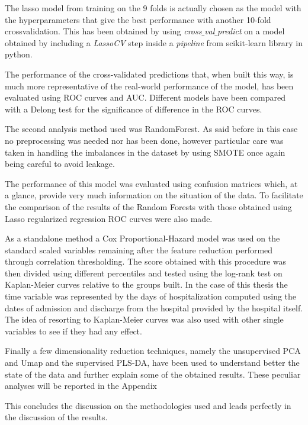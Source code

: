 The lasso model from training on the 9 folds is actually chosen as the model with the hyperparameters that give the best performance with another 10-fold crossvalidation. This has been obtained by using \textit{cross$\_$val$\_$predict} on a model obtained by including a \textit{LassoCV} step inside a \textit{pipeline} from scikit-learn library in python. 

The performance of the cross-validated predictions that, when built this way, is much more representative of the real-world performance of the model, has been evaluated using ROC curves and AUC.
Different models have been compared with a Delong test\cite{Delong} for the significance of difference in the ROC curves.

The second analysis method used was RandomForest. As said before in this case no preprocessing was needed nor has been done, however particular care was taken in handling the imbalances in the dataset by using SMOTE \cite{SMOTE} once again being careful to avoid leakage. 

The performance of this model was evaluated using confusion matrices which, at a glance, provide very much information on the situation of the data.
To facilitate the comparison of the results of the Random Forests with those obtained using Lasso regularized regression ROC curves were also made.

As a standalone method a Cox Proportional-Hazard model was used on the standard scaled variables remaining after the feature reduction performed through correlation thresholding. 
The score obtained with this procedure was then divided using different percentiles and tested using the log-rank test on Kaplan-Meier curves relative to the groups built.
In the case of this thesis the time variable was represented by the days of hospitalization computed using the dates of admission and discharge from the hospital provided by the hospital itself.
The idea of resorting to Kaplan-Meier curves was also used with other single variables to see if they had any effect. 

Finally a few dimensionality reduction techniques, namely the unsupervised PCA\cite{PCA} and Umap \cite{UMAP} and the supervised PLS-DA\cite{PLSDA}, have been used to understand better the state of the data and further explain some of the obtained results.
These peculiar analyses will be reported in the Appendix 

This concludes the discussion on the methodologies used and leads perfectly in the discussion of the results.









